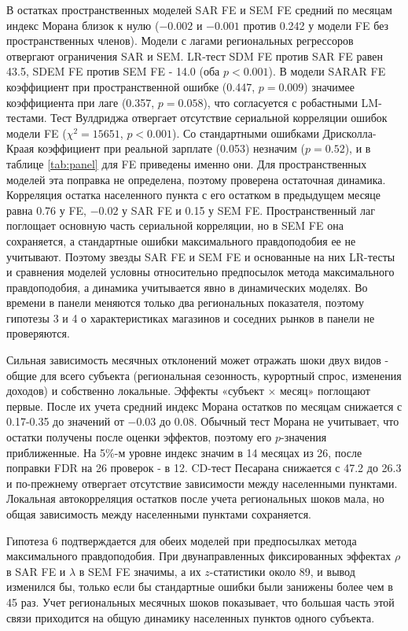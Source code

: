 \documentclass[12pt, a4paper]{article}
\begin{document}
В остатках пространственных моделей SAR FE и SEM FE средний по месяцам индекс Морана близок к
нулю ($-0.002$ и $-0.001$ против 0.242 у модели FE без пространственных членов). Модели с лагами
региональных регрессоров отвергают ограничения SAR и SEM. LR-тест SDM FE против SAR FE равен 43.5,
SDEM FE против SEM FE - 14.0 (оба $p < 0.001$). В модели SARAR FE коэффициент при пространственной
ошибке (0.447, $p = 0.009$) значимее коэффициента при лаге (0.357, $p = 0.058$), что согласуется с
робастными LM-тестами. Тест Вулдриджа отвергает отсутствие сериальной корреляции ошибок модели FE
($\chi^2 = 15651$, $p < 0.001$). Со стандартными ошибками Дрисколла-Краая \cite{driscoll1998} коэффициент при реальной
зарплате (0.053) незначим ($p = 0.52$), и в таблице \ref{tab:panel} для FE приведены именно они.
Для пространственных моделей эта поправка не определена, поэтому проверена остаточная динамика.
Корреляция остатка населенного пункта с его остатком в предыдущем месяце равна 0.76 у FE, $-0.02$ у SAR FE и
0.15 у SEM FE. Пространственный лаг поглощает основную часть сериальной корреляции, но в SEM FE она
сохраняется, а стандартные ошибки максимального правдоподобия ее не учитывают. Поэтому звезды
SAR FE и SEM FE и основанные на них LR-тесты и сравнения моделей условны относительно предпосылок
метода максимального правдоподобия, а динамика учитывается явно в динамических моделях. Во времени в панели меняются только два региональных
показателя, поэтому гипотезы 3 и 4 о характеристиках магазинов и соседних рынков в панели не
проверяются.

Сильная зависимость месячных отклонений может отражать шоки двух видов - общие для всего субъекта
(региональная сезонность, курортный спрос, изменения доходов) и собственно локальные. Эффекты
«субъект $\times$ месяц» поглощают первые. После их учета средний индекс Морана остатков по месяцам
снижается с 0.17-0.35 до значений от $-0.03$ до 0.08. Обычный тест Морана не учитывает, что
остатки получены после оценки эффектов, поэтому его $p$-значения приближенные. На 5\%-м уровне
индекс значим в 14 месяцах из 26, после поправки FDR на 26 проверок - в 12. CD-тест Песарана снижается с 47.2 до 26.3 и по-прежнему отвергает отсутствие
зависимости между населенными пунктами. Локальная автокорреляция остатков после учета региональных шоков
мала, но общая зависимость между населенными пунктами сохраняется.

Гипотеза 6 подтверждается для обеих моделей при предпосылках метода максимального правдоподобия.
При двунаправленных фиксированных эффектах $\rho$ в SAR FE и $\lambda$ в SEM FE значимы, а их
$z$-статистики около 89, и вывод изменился бы, только если бы стандартные ошибки были занижены
более чем в 45 раз. Учет региональных месячных шоков показывает, что большая
часть этой связи приходится на общую динамику населенных пунктов одного субъекта.
\end{document}

